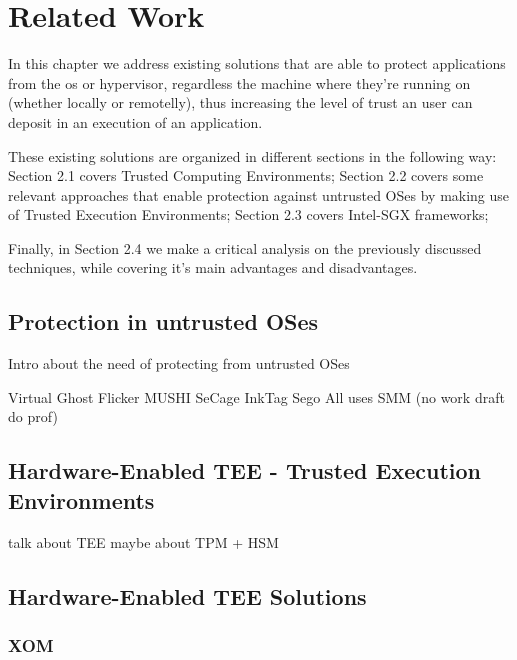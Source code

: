 \chapter{Related Work}
\label{cha:related_work}

In this chapter we address existing solutions that are able to protect applications from the \gls{os} or hypervisor, regardless the machine where they're running on (whether locally or remotelly), thus increasing the level of trust an user can deposit in an execution of an application.

These existing solutions are organized in different sections in the following way: Section 2.1 covers Trusted Computing Environments; Section 2.2 covers some relevant approaches that enable protection against untrusted OSes by making use of Trusted Execution Environments; Section 2.3 covers Intel-SGX frameworks; 

Finally, in Section 2.4 we make a critical analysis on the previously discussed techniques, while covering it's main advantages and disadvantages.

\section{Protection in untrusted OSes}

Intro about the need of protecting from untrusted OSes

Virtual Ghost
Flicker
MUSHI
SeCage
InkTag
Sego
All uses SMM (no work draft do prof)

\section{Hardware-Enabled TEE - Trusted Execution Environments}

talk about TEE
maybe about TPM + HSM


\section{Hardware-Enabled TEE Solutions}
\subsection{XOM}
